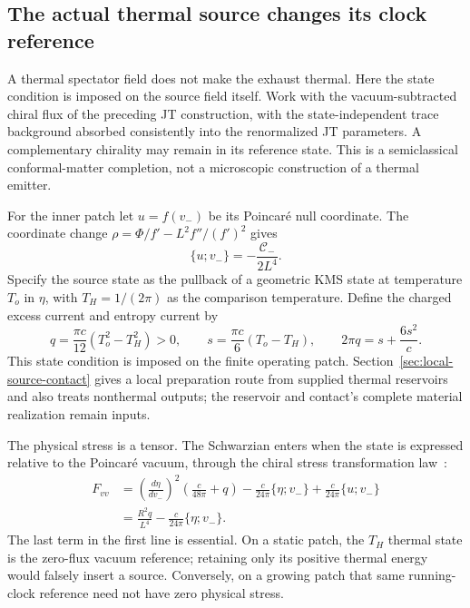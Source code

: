 \subsection{The actual thermal source changes its clock reference}
\label{sec:thermal-source-clock}

A thermal spectator field does not make the exhaust thermal. Here the
state condition is imposed on the source field itself. Work with the
vacuum-subtracted chiral flux of the preceding JT construction, with the
state-independent trace background absorbed consistently into the
renormalized JT parameters. A complementary chirality may remain in its
reference state. This is a semiclassical conformal-matter completion,
not a microscopic construction of a thermal emitter.

For the inner patch let $u=f(v_-)$ be its Poincar\'e null coordinate.
The coordinate change
$\rho=\Phi/f'-L^2f''/(f')^2$ gives
\[
 \{u;v_-\}=-\frac{\mathcal C_-}{2L^4}.
\]
Specify the source state as the pullback of a geometric KMS state at
temperature $T_o$ in $\eta$, with $T_H=1/(2\pi)$ as the comparison
temperature. Define the charged excess current and entropy current by
\begin{equation}\label{eq:thermal-source-excess}
 q=\frac{\pi c}{12}(T_o^2-T_H^2)>0,\qquad
 s=\frac{\pi c}{6}(T_o-T_H),\qquad
 2\pi q=s+\frac{6s^2}{c}.
\end{equation}
This state condition is imposed on the finite operating patch.
Section~\ref{sec:local-source-contact} gives a local preparation route
from supplied thermal reservoirs and also treats nonthermal outputs;
the reservoir and contact's complete material realization remain inputs.

The physical stress is a tensor. The Schwarzian enters when the state is
expressed relative to the Poincar\'e vacuum, through the chiral stress
transformation law~\cite[Eq.~(2.14)]{Hollands2019}:
\begin{align}\label{eq:actual-thermal-source}
 F_{vv}&=\left(\frac{d\eta}{dv_-}\right)^2
              \left(\frac{c}{48\pi}+q\right)
       -\frac{c}{24\pi}\{\eta;v_-\}
       +\frac{c}{24\pi}\{u;v_-\}\nonumber\\
       &=\frac{R^2q}{L^4}-\frac{c}{24\pi}\{\eta;v_-\}.
\end{align}
The last term in the first line is essential. On a static patch, the
$T_H$ thermal state is the zero-flux vacuum reference; retaining only its
positive thermal energy would falsely insert a source. Conversely, on a
growing patch that same running-clock reference need not have zero
physical stress.

